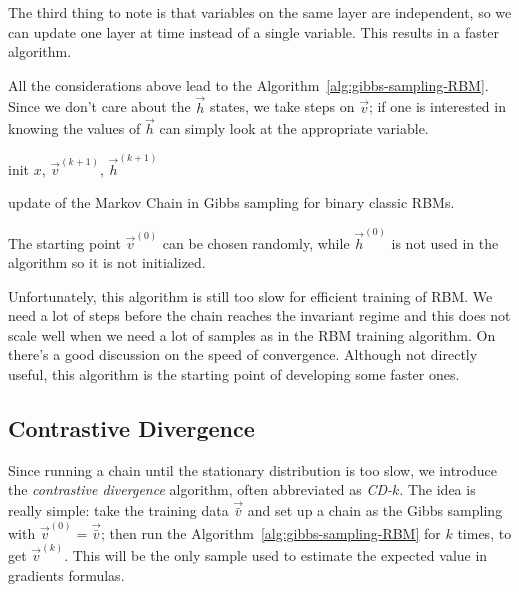   The third thing to note is that variables on the same layer are independent, so we can update
  one layer at time instead of a single variable. This results in a faster algorithm.
  
  All the considerations above lead to the Algorithm~\ref{alg:gibbs-sampling-RBM}. Since
  we don't care about the \(\vec{h}\) states, we take steps on \(\vec{v}\); if one is interested
  in knowing the values of \(\vec{h}\) can simply look at the appropriate variable.
  
  \begin{algorithm}[H]
    \DontPrintSemicolon
    
    
    init \(x\), \(\vec{v}^{(k+1)}\), \(\vec{h}^{(k+1)}\)\;
  
    \caption{update of the Markov Chain in Gibbs sampling for binary classic RBMs.}
    \label{alg:gibbs-sampling-RBM}
  \end{algorithm}

  The starting point \(\vec{v}^{(0)}\) can be chosen randomly, while \(\vec{h}^{(0)}\)
  is not used in the algorithm so it is not initialized.

  Unfortunately, this algorithm is still too slow for efficient training of RBM.
  We need a lot of steps before the chain reaches the invariant regime and this does not
  scale well when we need a lot of samples as in the RBM training algorithm. On
  \cite{fischer2012introduction} there's a good discussion on the speed of convergence.
  Although not directly useful, this algorithm is the starting point of developing
  some faster ones. 
   
  \subsection{Contrastive Divergence}
  Since running a chain until the stationary distribution is too slow, we introduce the
  \emph{contrastive divergence} algorithm, often  abbreviated as \emph{CD-\(k\)}.
  The idea is really simple:
  take the training data \(\vec{\bar{v}}\) and set up a chain as the Gibbs sampling with
  \(\vec{v}^{(0)} = \vec{\bar{v}}\); then run the Algorithm~\ref{alg:gibbs-sampling-RBM}
  for \(k\) times, to get \(\vec{v}^{(k)}\). This will be the only sample used to estimate
  the expected value in gradients formulas.
  
